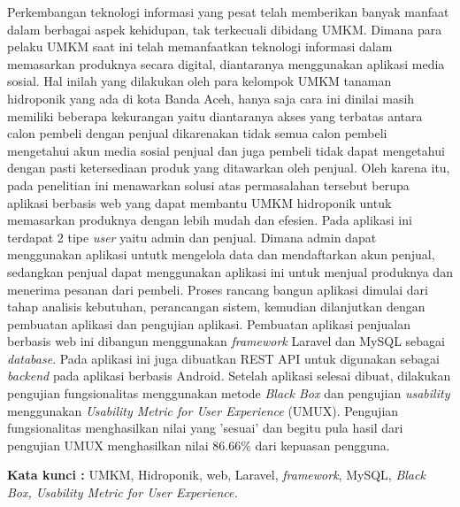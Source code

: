 \begin{abstractind}

Perkembangan teknologi informasi yang pesat telah memberikan banyak manfaat dalam berbagai aspek kehidupan, tak terkecuali dibidang UMKM. Dimana para pelaku UMKM saat ini telah memanfaatkan teknologi informasi dalam memasarkan produknya secara digital, diantaranya menggunakan aplikasi media sosial. Hal inilah yang dilakukan oleh para kelompok UMKM tanaman hidroponik yang ada di kota Banda Aceh, hanya saja cara ini dinilai masih memiliki beberapa kekurangan yaitu diantaranya akses yang terbatas antara calon pembeli dengan penjual dikarenakan tidak semua calon pembeli mengetahui akun media sosial penjual dan juga pembeli tidak dapat mengetahui dengan pasti ketersediaan produk yang ditawarkan oleh penjual. Oleh karena itu, pada penelitian ini menawarkan solusi atas permasalahan tersebut berupa aplikasi berbasis web yang dapat membantu UMKM hidroponik untuk memasarkan produknya dengan lebih mudah dan efesien. Pada aplikasi ini terdapat 2 tipe \textit{user} yaitu admin dan penjual. Dimana admin dapat menggunakan aplikasi untutk mengelola data dan mendaftarkan akun penjual, sedangkan penjual dapat menggunakan aplikasi ini untuk menjual produknya dan menerima pesanan dari pembeli. Proses rancang bangun aplikasi dimulai dari tahap analisis kebutuhan, perancangan sistem, kemudian dilanjutkan dengan pembuatan aplikasi dan pengujian aplikasi. Pembuatan aplikasi penjualan berbasis web ini dibangun menggunakan \textit{framework} Laravel dan MySQL sebagai \textit{database}. Pada aplikasi ini juga dibuatkan REST API untuk digunakan sebagai \textit{backend} pada aplikasi berbasis Android. Setelah aplikasi selesai dibuat, dilakukan pengujian fungsionalitas menggunakan metode \textit{Black Box} dan pengujian \textit{usability} menggunakan \textit{Usability Metric for User Experience} (UMUX). Pengujian fungsionalitas menghasilkan nilai yang 'sesuai' dan begitu pula hasil dari pengujian UMUX menghasilkan nilai 86.66\% dari kepuasan pengguna.


\bigskip
\noindent
\textbf{Kata kunci :} UMKM, Hidroponik, web, Laravel, \textit{framework}, MySQL, \textit{Black Box, Usability Metric for User Experience.}
\end{abstractind}